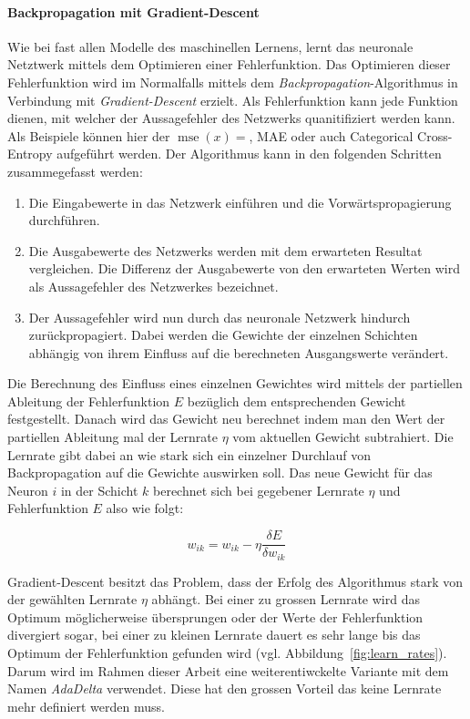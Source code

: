 \paragraph{Backpropagation mit Gradient-Descent} Wie bei fast allen Modelle des maschinellen Lernens, lernt das neuronale Netztwerk mittels dem Optimieren einer Fehlerfunktion. Das Optimieren dieser Fehlerfunktion wird im Normalfalls mittels dem \emph{Backpropagation}-Algorithmus in Verbindung mit \emph{Gradient-Descent} erzielt. Als Fehlerfunktion kann jede Funktion dienen, mit welcher der Aussagefehler des Netzwerks quanitifiziert werden kann. Als Beispiele können hier der $\operatorname{mse}(x) = $, MAE oder auch Categorical Cross-Entropy aufgeführt werden. Der Algorithmus kann in den folgenden Schritten zusammegefasst werden:

\begin{enumerate}
  \item Die Eingabewerte in das Netzwerk einführen und die Vorwärtspropagierung durchführen.
  \item Die Ausgabewerte des Netzwerks werden mit dem erwarteten Resultat vergleichen. Die Differenz der Ausgabewerte von den erwarteten Werten wird als Aussagefehler des Netzwerkes bezeichnet.
  \item Der Aussagefehler wird nun durch das neuronale Netzwerk hindurch zurückpropagiert. Dabei werden die Gewichte der einzelnen Schichten abhängig von ihrem Einfluss auf die berechneten Ausgangswerte verändert.
\end{enumerate}

Die Berechnung des Einfluss eines einzelnen Gewichtes wird mittels der partiellen Ableitung der Fehlerfunktion $E$ bezüglich dem entsprechenden Gewicht festgestellt. Danach wird das Gewicht neu berechnet indem man den Wert der partiellen Ableitung mal der Lernrate $\eta$ vom aktuellen Gewicht subtrahiert. Die Lernrate gibt dabei an wie stark sich ein einzelner Durchlauf von Backpropagation auf die Gewichte auswirken soll. Das neue Gewicht für das Neuron $i$ in der Schicht $k$ berechnet sich bei gegebener Lernrate $\eta$ und Fehlerfunktion $E$ also wie folgt:

\begin{equation}
w_{ik} = w_{ik} - \eta \frac{\delta E}{\delta w_{ik}}
\end{equation}

Gradient-Descent besitzt das Problem, dass der Erfolg des Algorithmus stark von der gewählten Lernrate $\eta$ abhängt. Bei einer zu grossen Lernrate wird das Optimum möglicherweise übersprungen oder der Werte der Fehlerfunktion divergiert sogar, bei einer zu kleinen Lernrate dauert es sehr lange bis das Optimum der Fehlerfunktion gefunden wird (vgl. Abbildung~\ref{fig:learn_rates}). Darum wird im Rahmen dieser Arbeit eine weiterentiwckelte Variante mit dem Namen \emph{AdaDelta} \cite{zeiler2012adadelta} verwendet. Diese hat den grossen Vorteil das keine Lernrate mehr definiert werden muss.

